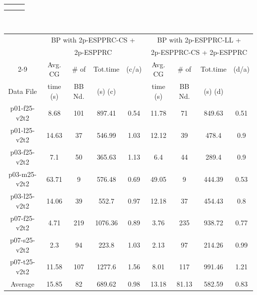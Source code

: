 \begin{table}[h]
\begin {tabular}[h]{|c|c|c|c|c|c|c|c|}
\multicolumn{6}{c}{\mbox{}}\\
\multicolumn{6}{c}{\mbox{}}\\
\end{tabular}
\\
\begin {tabular}[h]{|c|c|c|c|c|c|c|c|c|}
\hline
\mbox{} & \multicolumn{4}{|c|}{BP with 2p-ESPPRC-CS + } & \multicolumn{4}{|c|}{BP with 2p-ESPPRC-LL + }\\ %
\mbox{} & \multicolumn{4}{|c|}{2p-ESPPRC} & \multicolumn{4}{|c|}{2p-ESPPRC-CS + 2p-ESPPRC}\\\cline {2-9}
\mbox{} &  Avg. CG   & \# of    & Tot.time  &  (c/a) &   Avg. CG   & \# of    & Tot.time  & (d/a) \\
Data File & time (s) & BB Nd.   & (s) (c) &        &   time (s)  & BB Nd.   & (s) (d) &  \mbox{} \\\hline
p01-f25-v2t2    & 8.68  & 101 & 897.41 & 0.54   & 11.78 & 71    & 849.63 & 0.51 \\
p01-l25-v2t2    & 14.63 & 37  & 546.99 & 1.03   & 12.12 & 39    & 478.4  & 0.9  \\
p03-f25-v2t2    & 7.1   & 50  & 365.63 & 1.13   & 6.4   & 44    & 289.4  & 0.9  \\
p03-m25-v2t2    & 63.71 & 9   & 576.48 & 0.69   & 49.05 & 9 & 444.39 & 0.53 \\
p03-l25-v2t2    & 14.06 & 39  & 552.7   & 0.97  & 12.18 & 37    & 454.43 & 0.8  \\
p07-f25-v2t2    & 4.71  & 219 & 1076.36 & 0.89  & 3.76  & 235   & 938.72 & 0.77 \\
p07-s25-v2t2    & 2.3   & 94 & 223.8    & 1.03  & 2.13  & 97    & 214.26 & 0.99 \\
p07-t25-v2t2    & 11.58 & 107 & 1277.6  & 1.56  & 8.01  & 117   & 991.46 & 1.21 \\\hline
Average     & 15.85 & 82  & 689.62  & 0.98  & 13.18 & 81.13 & 582.59 & 0.83 \\\hline
\end{tabular}
\end{table}

